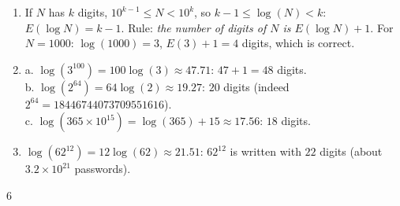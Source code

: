 {\begin{enumerate}
\begin{enumerate}[label=\alph*.]
\item $E(\log N)=14$, and $14+1=15$ digits.
\end{enumerate}
\item If $N$ has $k$ digits, $10^{k-1}\leqslant N<10^k$, so $k-1\leqslant\log(N)<k$: $E(\log N)=k-1$. Rule: \emph{the number of digits of $N$ is $E(\log N)+1$}. For $N=\num{1000}$: $\log(\num{1000})=3$, $E(3)+1=4$ digits, which is correct.
\item a. $\log(3^{100})=100\log(3)\approx\num{47,71}$: $47+1=48$ digits.\\
b. $\log(2^{64})=64\log(2)\approx\num{19,27}$: $20$ digits (indeed $2^{64}=\num{18446744073709551616}$).\\
c. $\log(365\times10^{15})=\log(365)+15\approx\num{17,56}$: $18$ digits.
\item $\log(62^{12})=12\log(62)\approx\num{21,51}$: $62^{12}$ is written with $22$ digits (about $\num{3,2}\times10^{21}$ passwords).
\end{enumerate}
}{6}

